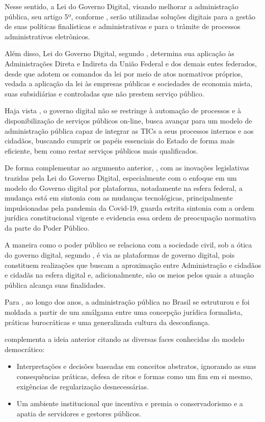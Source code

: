 Nesse sentido, a Lei do Governo Digital, visando melhorar a administração pública, seu artigo 5º, conforme \cite{l14129}, serão utilizadas soluções digitais para a gestão de suas políticas finalísticas e administrativas e para o trâmite de processos administrativos eletrônicos.

Além disso, Lei do Governo Digital, segundo \cite{l14129}, determina sua aplicação às Administrações Direta e Indireta da União Federal e dos demais entes federados, desde que adotem os comandos da lei por meio de atos normativos próprios, vedada a aplicação da lei às empresas públicas e sociedades de economia mista, suas subsidiárias e controladas que não prestem serviço público.

Haja vista \cite{reck2021transformaccao}, o governo digital não se restringe à automação de processos e à disponibilização de serviços públicos on-line, busca avançar para um modelo de administração pública capaz de integrar as TICs a seus processos internos e aos cidadãos, buscando cumprir os papéis essenciais do Estado de forma mais eficiente, bem como restar serviços públicos mais qualificados. 

De forma complementar ao argumento anterior, \cite{lima2023governo}, com as inovações legislativas trazidas pela Lei do Governo Digital, especialmente com o enfoque em um modelo do Governo digital por plataforma, notadamente na esfera federal, a mudança está em sintonia com as mudanças tecnológicas, principalmente impulsionadas pela pandemia da Covid-19, guarda estrita sintonia com a ordem jurídica constitucional vigente e evidencia essa ordem de preocupação normativa da parte do Poder Público.

A maneira como o poder público se relaciona com a sociedade civil, sob a ótica do governo digital, segundo  \cite{lima2023governo}, é via as plataformas de governo digital, pois constituem realizações que buscam a aproximação entre Administração e cidadãos e cidadãs na esfera digital e, adicionalmente, são os meios pelos quais a atuação pública alcança suas finalidades.

Para \cite{de2020governo}, ao longo dos anos, a administração pública no Brasil se estruturou e foi moldada a partir de um amálgama entre uma concepção jurídica formalista, práticas burocráticas e uma generalizada cultura da desconfiança. 

\cite{de2020governo} complementa a ideia anterior citando as diversas faces 
conhecidas do modelo democrático:  

\begin{itemize}
    \item Interpretações e decisões baseadas em conceitos abstratos, ignorando as suas consequências práticas, defesa de ritos e formas como um fim em si mesmo, exigências de regularização desnecessárias.
    \item Um ambiente institucional que incentiva e premia o conservadorismo e a apatia de servidores e gestores públicos.
\end{itemize}

